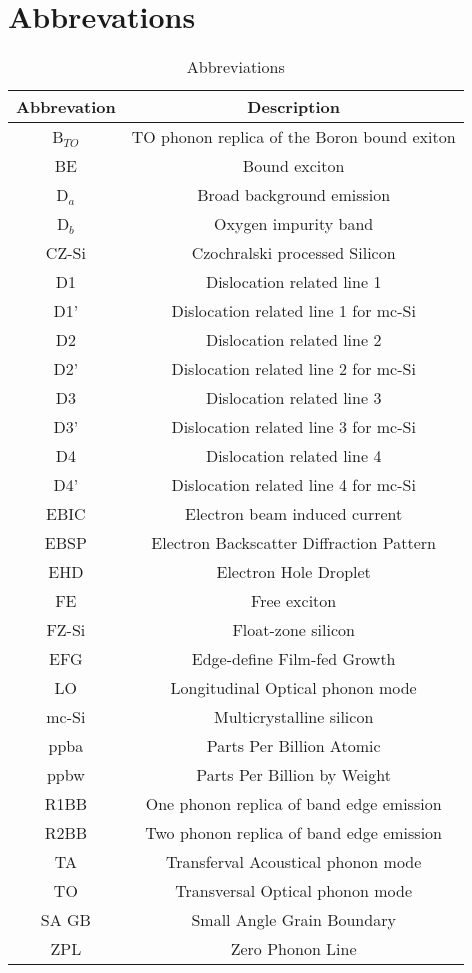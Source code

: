 		\section{Abbrevations}
		
		\begin{table}[H]
\centering
\begin{tabular}{|c|c|}
\hline

		\textbf{Abbrevation} & \textbf{Description} \\ \hline
		B$_{TO}$ & TO phonon replica of the Boron bound exiton  \\ \hline
		BE & Bound exciton \\ \hline
		D$_a$ & Broad background emission  \\ \hline
		D$_b$ & Oxygen impurity band  \\ \hline
		CZ-Si & Czochralski processed Silicon \\ \hline
		D1	& Dislocation related line 1  \\ \hline
		D1' & Dislocation related line 1 for mc-Si  \\ \hline
		D2	& Dislocation related line 2 \\ \hline
		D2' & Dislocation related line 2 for mc-Si  \\ \hline
		D3	& Dislocation related line 3  \\ \hline
		D3' & Dislocation related line 3 for mc-Si  \\ \hline
		D4	& Dislocation related line 4  \\ \hline
		D4' & Dislocation related line 4 for mc-Si  \\ \hline
		EBIC & Electron beam induced current \\ \hline
		EBSP & Electron Backscatter Diffraction Pattern \\ \hline
		EHD & Electron Hole Droplet	\\ \hline
		FE & Free exciton \\ \hline
		FZ-Si & Float-zone silicon \\ \hline
		EFG & Edge-define Film-fed Growth \\ \hline
		LO & Longitudinal Optical phonon mode \\ \hline
		mc-Si & Multicrystalline silicon \\ \hline
		ppba & Parts Per Billion Atomic \\ \hline
		ppbw & Parts Per Billion by Weight \\ \hline
		R1BB & One phonon replica of band edge emission \\ \hline
		R2BB & Two phonon replica of band edge emission \\ \hline
		TA & Transferval Acoustical phonon mode \\ \hline
		TO & Transversal Optical phonon mode \\ \hline
		SA GB & Small Angle Grain Boundary \\ \hline
		ZPL & Zero Phonon Line \\ \hline

		\end{tabular}
\caption{Abbreviations}
\label{abbreviations}
\end{table}
		
		
